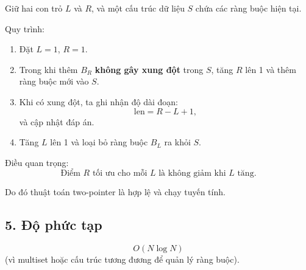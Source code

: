 Giữ hai con trỏ $L$ và $R$, và một cấu trúc dữ liệu $S$ chứa các ràng buộc hiện tại.

Quy trình:

\begin{enumerate}
\item Đặt $L = 1$, $R = 1$.
\item Trong khi thêm $B_R$ \textbf{không gây xung đột} trong $S$, tăng $R$ lên 1 và thêm ràng buộc mới vào $S$.
\item Khi có xung đột, ta ghi nhận độ dài đoạn:
\[
\text{len} = R - L + 1,
\]
và cập nhật đáp án.
\item Tăng $L$ lên 1 và loại bỏ ràng buộc $B_L$ ra khỏi $S$.
\end{enumerate}

Điều quan trọng:
\[
\text{Điểm } R \text{ tối ưu cho mỗi } L \text{ là không giảm khi } L \text{ tăng.}
\]

Do đó thuật toán two-pointer là hợp lệ và chạy tuyến tính.

\subsection*{5. Độ phức tạp}

\[
O(N \log N)
\]
(vì multiset hoặc cấu trúc tương đương để quản lý ràng buộc).

